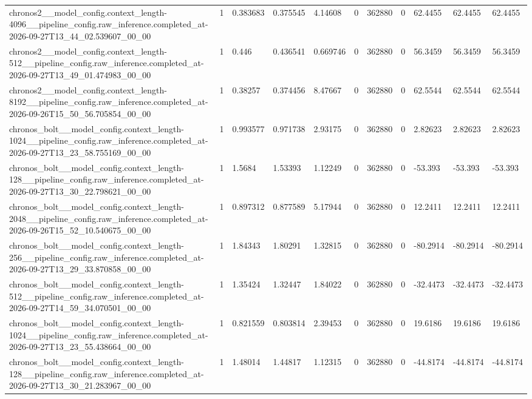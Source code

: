 \begin{tabular}{lllllllllll}
chronos2\_\_model\_config.context\_length-4096\_\_pipeline\_config.raw\_inference.completed\_at-2026-09-27T13\_44\_02.539607\_00\_00 & 1 & 0.383683 & 0.375545 & 4.14608 & 0 & 362880 & 0 & 62.4455 & 62.4455 & 62.4455 \\
chronos2\_\_model\_config.context\_length-512\_\_pipeline\_config.raw\_inference.completed\_at-2026-09-27T13\_49\_01.474983\_00\_00 & 1 & 0.446 & 0.436541 & 0.669746 & 0 & 362880 & 0 & 56.3459 & 56.3459 & 56.3459 \\
chronos2\_\_model\_config.context\_length-8192\_\_pipeline\_config.raw\_inference.completed\_at-2026-09-26T15\_50\_56.705854\_00\_00 & 1 & 0.38257 & 0.374456 & 8.47667 & 0 & 362880 & 0 & 62.5544 & 62.5544 & 62.5544 \\
chronos\_bolt\_\_model\_config.context\_length-1024\_\_pipeline\_config.raw\_inference.completed\_at-2026-09-27T13\_23\_58.755169\_00\_00 & 1 & 0.993577 & 0.971738 & 2.93175 & 0 & 362880 & 0 & 2.82623 & 2.82623 & 2.82623 \\
chronos\_bolt\_\_model\_config.context\_length-128\_\_pipeline\_config.raw\_inference.completed\_at-2026-09-27T13\_30\_22.798621\_00\_00 & 1 & 1.5684 & 1.53393 & 1.12249 & 0 & 362880 & 0 & -53.393 & -53.393 & -53.393 \\
chronos\_bolt\_\_model\_config.context\_length-2048\_\_pipeline\_config.raw\_inference.completed\_at-2026-09-26T15\_52\_10.540675\_00\_00 & 1 & 0.897312 & 0.877589 & 5.17944 & 0 & 362880 & 0 & 12.2411 & 12.2411 & 12.2411 \\
chronos\_bolt\_\_model\_config.context\_length-256\_\_pipeline\_config.raw\_inference.completed\_at-2026-09-27T13\_29\_33.870858\_00\_00 & 1 & 1.84343 & 1.80291 & 1.32815 & 0 & 362880 & 0 & -80.2914 & -80.2914 & -80.2914 \\
chronos\_bolt\_\_model\_config.context\_length-512\_\_pipeline\_config.raw\_inference.completed\_at-2026-09-27T14\_59\_34.070501\_00\_00 & 1 & 1.35424 & 1.32447 & 1.84022 & 0 & 362880 & 0 & -32.4473 & -32.4473 & -32.4473 \\
chronos\_bolt\_\_model\_config.context\_length-1024\_\_pipeline\_config.raw\_inference.completed\_at-2026-09-27T13\_23\_55.438664\_00\_00 & 1 & 0.821559 & 0.803814 & 2.39453 & 0 & 362880 & 0 & 19.6186 & 19.6186 & 19.6186 \\
chronos\_bolt\_\_model\_config.context\_length-128\_\_pipeline\_config.raw\_inference.completed\_at-2026-09-27T13\_30\_21.283967\_00\_00 & 1 & 1.48014 & 1.44817 & 1.12315 & 0 & 362880 & 0 & -44.8174 & -44.8174 & -44.8174 \\

\end{tabular}
